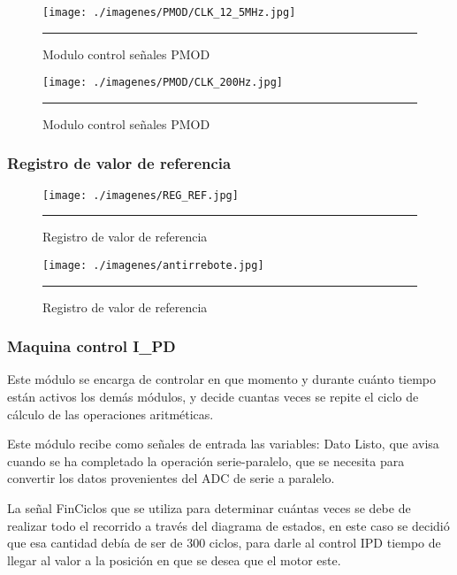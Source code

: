 \documentclass[12pt,a4paper]{article} %
\begin{document}
\begin{figure}[htbp]
  \centering
    \texttt{[image: ./imagenes/PMOD/CLK\_12\_5MHz.jpg]}
    \rule{35em}{0.3pt}
  \caption[CLK12.5]{Modulo control señales PMOD}
  \label{fig:CLK12.5}
\end{figure}

\begin{figure}[htbp]
  \centering
    \texttt{[image: ./imagenes/PMOD/CLK\_200Hz.jpg]}
    \rule{35em}{0.3pt}
  \caption[CLK200]{Modulo control señales PMOD}
  \label{fig:CLK200}
\end{figure}

\subsubsection{Registro de valor de referencia}

\begin{figure}[htbp]
  \centering
    \texttt{[image: ./imagenes/REG\_REF.jpg]}
    \rule{35em}{0.3pt}
  \caption[REF]{Registro de valor de referencia}
  \label{fig:REF}
\end{figure}

\begin{figure}[htbp]
  \centering
    \texttt{[image: ./imagenes/antirrebote.jpg]}
    \rule{35em}{0.3pt}
  \caption[rebot]{Registro de valor de referencia}
  \label{fig:rebot}
\end{figure}

\subsubsection{Maquina control I\_PD}

Este módulo se encarga de controlar en que momento y durante cuánto tiempo están activos los demás módulos, y decide cuantas veces se repite el ciclo de cálculo de las operaciones aritméticas. 

Este módulo recibe como señales de entrada las  variables: Dato Listo, que avisa cuando se ha completado la operación serie-paralelo, que se necesita para convertir los datos provenientes del ADC de serie a paralelo. 

La señal FinCiclos que se utiliza para determinar cuántas veces se debe de realizar todo el recorrido a través del diagrama de estados, en este caso se decidió que esa cantidad debía de ser de 300 ciclos, para darle al control IPD tiempo de llegar al valor a la posición en que se desea que el motor este. 
\end{document}
